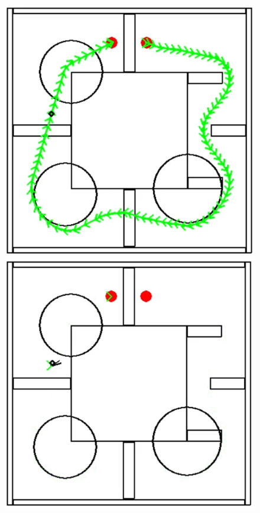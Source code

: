  \begin{figure}[!htb]
    \centering
    \begin{minipage}[b]{.3\linewidth}
        \centering
        \includegraphics[width=0.8\linewidth]{Figures/07_simulation/basic/12basic.png}
    \end{minipage}%
    \hfill%
    \begin{minipage}[b]{.3\linewidth}
        \centering
        \includegraphics[width=0.8\linewidth]{Figures/07_simulation/basic/13basic.png}
    \end{minipage}%
    \hfill%
    \begin{minipage}[b]{.3\linewidth}

\end{minipage}
\end{figure}
